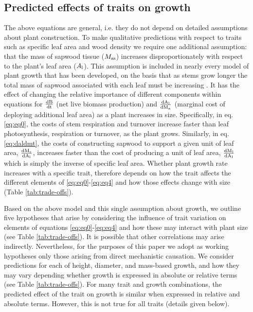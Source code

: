 \documentclass[a4paper,11pt]{article}
\begin{document}
\subsection*{Predicted effects of traits on growth}

The above equations are general, i.e. they do not depend on detailed assumptions about plant construction. To make qualitative predictions with respect to traits such as specific leaf area and wood density we require one additional assumption: that the mass of sapwood tissue ($M_{\rm ss}$) increases disproportionately with respect to the plant's leaf area ($A_{\rm l}$). This assumption is included in nearly every model of plant growth that has been developed, on the basis that as stems grow longer the total mass of sapwood associated with each leaf must be increasing \citep[e.g.][]{Falster:2011ii,King-1999,Enquist:2007ek}. It has the effect of changing the relative importance of different components within equations for $\frac{\rm{d} B}{\rm{d} t}$ (net live biomass production) and $\frac{\rm{d} A_{\rm l}}{\rm{d} M_{\rm a} }$ (marginal cost of deploying additional leaf area) as a plant increases in size. Specifically, in eq. \ref{eq:eq0}, the costs of stem respiration and turnover increase faster than leaf photosynthesis, respiration or turnover, as the plant grows. Similarly, in eq. \ref{eq:daldmt}, the costs of constructing sapwood to support a given unit of leaf area, $\frac{\rm{d} M_{\rm s}}{\rm{d} A_{\rm l}}$, increases faster than the cost of producing a unit of leaf area, $\frac{\rm{d} M_{\rm l}}{\rm{d} A_{\rm l}}$ which is simply the inverse of specific leaf area. Whether plant growth rate increases with a specific trait, therefore depends on how the trait affects the different elements of \ref{eq:eq0}-\ref{eq:eq4} and how those effects change with size (Table \ref{tab:trade-offs}).

Based on the above model and this single assumption about growth, we outline five hypotheses that arise by considering the influence of trait variation on elements of equations  \ref{eq:eq0}-\ref{eq:eq4} and how these may interact with plant size (see Table \ref{tab:trade-offs}). It is possible that other correlations may arise indirectly. Nevertheless, for the purposes of this paper we adopt as working hypotheses only those arising from direct mechanistic causation. We consider predictions for each of height, diameter, and mass-based growth, and how they  may vary depending whether growth is expressed in absolute or relative terms (see Table \ref{tab:trade-offs}). For many trait and growth combinations, the predicted effect of the trait on growth is similar when expressed in relative and absolute terms. However, this is not true for all traits (details given below).
\end{document}

